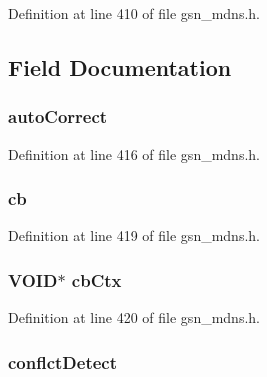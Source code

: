 Definition at line 410 of file gsn\_\-mdns.h.



\subsection{Field Documentation}
\hypertarget{a00143_a6922e2bbd8ef32a53abd5bbf5e2b40a1}{
\subsubsection[{autoCorrect}]{ {\bf autoCorrect}}}
\label{a00143_a6922e2bbd8ef32a53abd5bbf5e2b40a1}


Definition at line 416 of file gsn\_\-mdns.h.

\hypertarget{a00143_a9537e3f5198ad7dff4aeecabdc552166}{
\subsubsection[{cb}]{ {\bf cb}}}
\label{a00143_a9537e3f5198ad7dff4aeecabdc552166}


Definition at line 419 of file gsn\_\-mdns.h.

\hypertarget{a00143_abc1717c5357c7dda5c2abef096a06f1f}{
\subsubsection[{cbCtx}]{\setlength{\rightskip}{0pt plus 5cm}VOID$\ast$ {\bf cbCtx}}}
\label{a00143_abc1717c5357c7dda5c2abef096a06f1f}


Definition at line 420 of file gsn\_\-mdns.h.

\hypertarget{a00143_af923e50a1240af46d2dedbe9789fb582}{
\subsubsection[{conflctDetect}]{ {\bf conflctDetect}}}
\label{a00143_af923e50a1240af46d2dedbe9789fb582}


